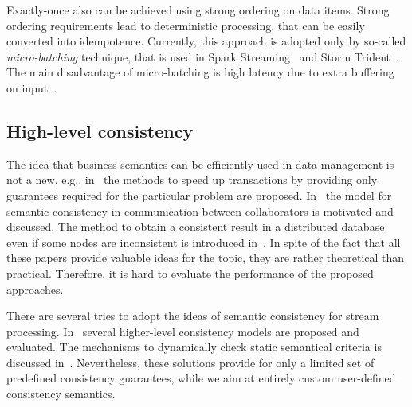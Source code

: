 Exactly-once also can be achieved using strong ordering on data items. Strong ordering requirements lead to deterministic processing, that can be easily converted into idempotence. Currently, this approach is adopted only by so-called {\em micro-batching} technique, that is used in Spark Streaming~\cite{Zaharia:2012:DSE:2342763.2342773} and Storm Trident~\cite{apache:storm:trident}. The main disadvantage of micro-batching is high latency due to extra buffering on input~\cite{S7530084}.

\subsection{High-level consistency}

The idea that business semantics can be efficiently used in data management is not a new, e.g., in~\cite{Garcia-Molina:1983:USK:319983.319985} the methods to speed up transactions by providing only guarantees required for the particular problem are proposed. In~\cite{Guo:2010:CMS:1822018.1822052} the model for semantic consistency in communication between collaborators is motivated and discussed. The method to obtain a consistent result in a distributed database even if some nodes are inconsistent is introduced in~\cite{Rodriguez:2008:ITA:1463434.1463480}. In spite of the fact that all these papers provide valuable ideas for the topic, they are rather theoretical than practical. Therefore, it is hard to evaluate the performance of the proposed approaches.

There are several tries to adopt the ideas of semantic consistency for stream processing. In~\cite{Mihaila:2008:AIO:1458082.1458132} several higher-level consistency models are proposed and evaluated. The mechanisms to dynamically check static semantical criteria is discussed in~\cite{Fischer:2010:SSP:1739041.1739068}. Nevertheless, these solutions provide for only a limited set of predefined consistency guarantees, while we aim at entirely custom user-defined consistency semantics.  